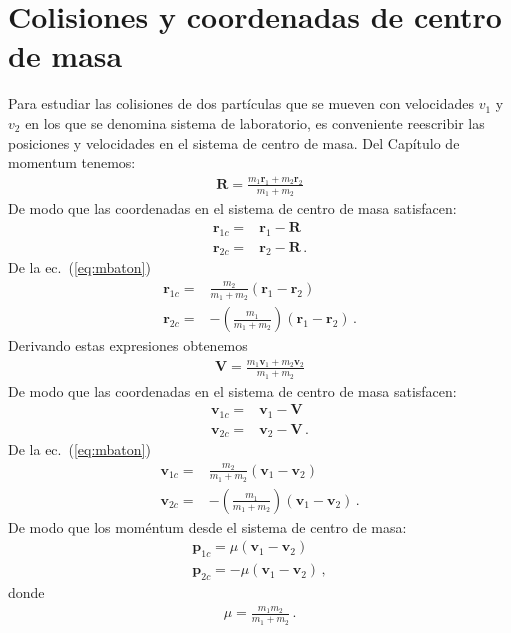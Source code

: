 \section{Colisiones y coordenadas de centro de masa}
Para estudiar las colisiones de dos partículas que se mueven con
velocidades $v_1$ y $v_2$ en los que se denomina sistema de
laboratorio, es conveniente reescribir las posiciones y velocidades en
el sistema de centro de masa. Del Capítulo de momentum tenemos:
  \begin{align}
    \label{eq:mbaton}
    \mathbf{R}=\frac{m_1\mathbf{r}_1+m_2\mathbf{r}_2}{m_1+m_2}
  \end{align}
De modo que las coordenadas en el sistema de centro de masa satisfacen:
\begin{align}
  \mathbf{r}_{1c} =&\mathbf{r}_1-\mathbf{R}\nonumber\\
  \mathbf{r}_{2c}=&\mathbf{r}_2-\mathbf{R}\,.
\end{align}
De la ec.~(\ref{eq:mbaton})
\begin{align}
  \mathbf{r}_{1c}
    =&\frac{m_2}{m_1+m_2}(\mathbf{r}_1-\mathbf{r}_2)\nonumber\\
 \mathbf{r}_{2c}=&-\left(\frac{m_1}{m_1+m_2} \right)\left(\mathbf{r}_1-\mathbf{r}_2 \right)\,.
\end{align}
Derivando estas expresiones obtenemos
  \begin{align}
    \label{eq:mbaton}
    \mathbf{V}=\frac{m_1\mathbf{v}_1+m_2\mathbf{v}_2}{m_1+m_2}
  \end{align}
De modo que las coordenadas en el sistema de centro de masa satisfacen:
\begin{align}
  \mathbf{v}_{1c} =&\mathbf{v}_1-\mathbf{V}\nonumber\\
  \mathbf{v}_{2c}=&\mathbf{v}_2-\mathbf{V}\,.
\end{align}
De la ec.~(\ref{eq:mbaton})
\begin{align}
  \mathbf{v}_{1c}
    =&\frac{m_2}{m_1+m_2}(\mathbf{v}_1-\mathbf{v}_2)\nonumber\\
 \mathbf{v}_{2c}=&-\left(\frac{m_1}{m_1+m_2} \right)\left(\mathbf{v}_1-\mathbf{v}_2 \right)\,.
\end{align}
De modo que los moméntum desde el sistema de centro de masa:
\begin{align}
  \mathbf{p}_{1c}=\mu(\mathbf{v}_1-\mathbf{v}_2)\nonumber\\
  \mathbf{p}_{2c}=-\mu(\mathbf{v}_1-\mathbf{v}_2)\,,
\end{align}
donde
\begin{align}
  \mu=\frac{m_1m_2}{m_1+m_2}\,.
\end{align}

